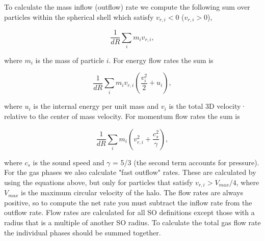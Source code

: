 To calculate the mass inflow (outflow) rate
we compute the following sum over particles within the spherical shell which satisfy
$v_{r,i} < 0$ ($v_{r,i} > 0$),

\begin{equation}
    \frac{1}{dR} \sum_{i} m_i v_{r, i},
\end{equation}

where $m_i$ is the mass of particle $i$. For energy flow rates the sum is

\begin{equation}
    \frac{1}{dR} \sum_{i} m_i v_{r, i} \left(\frac{v_i^2}{2} + u_i\right),
\end{equation}

where $u_i$ is the internal energy per unit mass and $v_i$ is the total 3D velocity·
relative to the center of mass velocity. For momentum flow rates the sum is

\begin{equation}
    \frac{1}{dR} \sum_{i} m_i \left(v_{r,i}^2 + \frac{c_s^2}{\gamma}\right),
\end{equation}

where $c_s$ is the sound speed and $\gamma$ = 5/3 (the second term accounts for pressure).
For the gas phases we also calculate "fast outflow" rates.
These are calculated by using the equations above, but only for particles that satisfy $v_{r,i} > V_{max} / 4$,
where $V_{max}$ is the maximum circular velocity of the halo. The flow rates are always positive,
so to compute the net rate you must subtract the inflow rate from the outflow rate.
Flow rates are calculated for all SO definitions except those with a radius that is a multiple of another SO radius.
To calculate the total gas flow rate the individual phases should be summed together.
